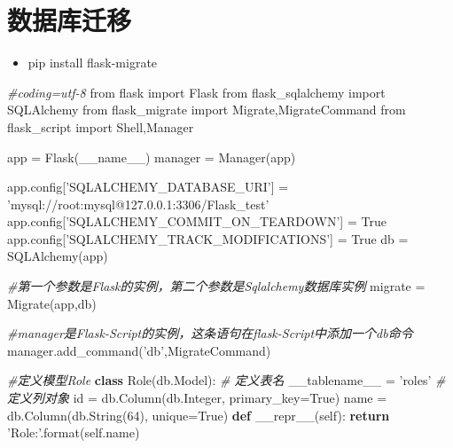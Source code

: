 \documentclass[11pt]{article}
\providecommand{\tightlist}{%
      \setlength{\itemsep}{0pt}\setlength{\parskip}{0pt}}
\newenvironment{Shaded}{}{}
\newcommand{\KeywordTok}[1]{\textcolor[rgb]{0.00,0.44,0.13}{\textbf{{#1}}}}
\newcommand{\DecValTok}[1]{\textcolor[rgb]{0.25,0.63,0.44}{{#1}}}
\newcommand{\StringTok}[1]{\textcolor[rgb]{0.25,0.44,0.63}{{#1}}}
\newcommand{\CommentTok}[1]{\textcolor[rgb]{0.38,0.63,0.69}{\textit{{#1}}}}
\newcommand{\FunctionTok}[1]{\textcolor[rgb]{0.02,0.16,0.49}{{#1}}}
\newcommand{\NormalTok}[1]{{#1}}
\newcommand{\ImportTok}[1]{{#1}}
\newcommand{\VariableTok}[1]{\textcolor[rgb]{0.10,0.09,0.49}{{#1}}}
\newcommand{\ControlFlowTok}[1]{\textcolor[rgb]{0.00,0.44,0.13}{\textbf{{#1}}}}
\newcommand{\OperatorTok}[1]{\textcolor[rgb]{0.40,0.40,0.40}{{#1}}}
\newcommand{\BuiltInTok}[1]{{#1}}
\begin{document}
    \hypertarget{ux6570ux636eux5e93ux8fc1ux79fb}{%
\section{数据库迁移}\label{ux6570ux636eux5e93ux8fc1ux79fb}}

\begin{itemize}
\tightlist
\item
  pip install flask-migrate
\end{itemize}

\begin{Shaded}
\begin{Highlighting}[]
\CommentTok{#coding=utf-8}
\ImportTok{from}\NormalTok{ flask }\ImportTok{import}\NormalTok{ Flask}
\ImportTok{from}\NormalTok{ flask_sqlalchemy }\ImportTok{import}\NormalTok{ SQLAlchemy}
\ImportTok{from}\NormalTok{ flask_migrate }\ImportTok{import}\NormalTok{ Migrate,MigrateCommand}
\ImportTok{from}\NormalTok{ flask_script }\ImportTok{import}\NormalTok{ Shell,Manager}

\NormalTok{app }\OperatorTok{=}\NormalTok{ Flask(}\VariableTok{__name__}\NormalTok{)}
\NormalTok{manager }\OperatorTok{=}\NormalTok{ Manager(app)}

\NormalTok{app.config[}\StringTok{'SQLALCHEMY_DATABASE_URI'}\NormalTok{] }\OperatorTok{=} \StringTok{'mysql://root:mysql@127.0.0.1:3306/Flask_test'}
\NormalTok{app.config[}\StringTok{'SQLALCHEMY_COMMIT_ON_TEARDOWN'}\NormalTok{] }\OperatorTok{=} \VariableTok{True}
\NormalTok{app.config[}\StringTok{'SQLALCHEMY_TRACK_MODIFICATIONS'}\NormalTok{] }\OperatorTok{=} \VariableTok{True}
\NormalTok{db }\OperatorTok{=}\NormalTok{ SQLAlchemy(app)}

\CommentTok{#第一个参数是Flask的实例，第二个参数是Sqlalchemy数据库实例}
\NormalTok{migrate }\OperatorTok{=}\NormalTok{ Migrate(app,db) }

\CommentTok{#manager是Flask-Script的实例，这条语句在flask-Script中添加一个db命令}
\NormalTok{manager.add_command(}\StringTok{'db'}\NormalTok{,MigrateCommand)}

\CommentTok{#定义模型Role}
\KeywordTok{class}\NormalTok{ Role(db.Model):}
    \CommentTok{# 定义表名}
\NormalTok{    __tablename__ }\OperatorTok{=} \StringTok{'roles'}
    \CommentTok{# 定义列对象}
    \BuiltInTok{id} \OperatorTok{=}\NormalTok{ db.Column(db.Integer, primary_key}\OperatorTok{=}\VariableTok{True}\NormalTok{)}
\NormalTok{    name }\OperatorTok{=}\NormalTok{ db.Column(db.String(}\DecValTok{64}\NormalTok{), unique}\OperatorTok{=}\VariableTok{True}\NormalTok{)}
    \KeywordTok{def} \FunctionTok{__repr__}\NormalTok{(}\VariableTok{self}\NormalTok{):}
        \ControlFlowTok{return} \StringTok{'Role:'}\NormalTok{.}\BuiltInTok{format}\NormalTok{(}\VariableTok{self}\NormalTok{.name)}


\end{Highlighting}
\end{Shaded}
\end{document}

